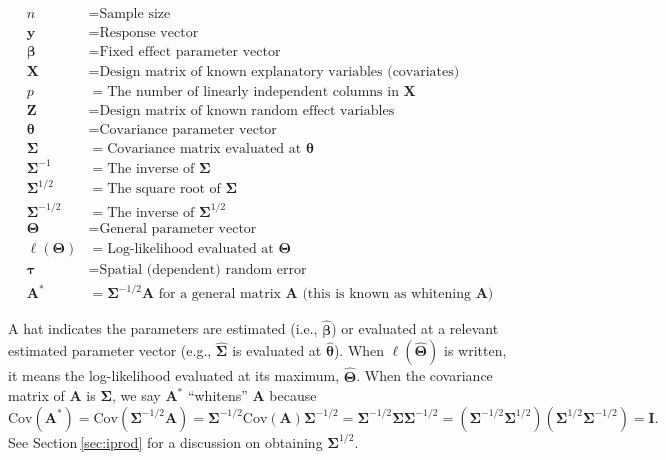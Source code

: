 \documentclass[10pt,letterpaper]{article}
\begin{document}
\begin{equation*}
  \begin{split}
   n & = \text{Sample size} \\
   \mathbf{y} & = \text{Response vector} \\
   \boldsymbol{\beta} & = \text{Fixed effect parameter vector} \\
   \mathbf{X} & = \text{Design matrix of known explanatory variables (covariates)} \\
   p & = \text{The number of linearly independent columns in } \mathbf{X} \\
   \mathbf{Z} & = \text{Design matrix of known random effect variables} \\
   \boldsymbol{\theta} & = \text{Covariance parameter vector} \\   
   \boldsymbol{\Sigma} & = \text{Covariance matrix evaluated at } \boldsymbol{\theta} \\
   \boldsymbol{\Sigma}^{-1} & = \text{The inverse of } \boldsymbol{\Sigma} \\
   \boldsymbol{\Sigma}^{1/2} & = \text{The square root of } \boldsymbol{\Sigma} \\
   \boldsymbol{\Sigma}^{-1/2} & = \text{The inverse of } \boldsymbol{\Sigma}^{1/2} \\
   \boldsymbol{\Theta} & = \text{General parameter vector} \\  
   \ell(\boldsymbol{\Theta}) & = \text{Log-likelihood evaluated at } \boldsymbol{\Theta} \\
   \boldsymbol{\tau} & = \text{Spatial (dependent) random error} \\
   \mathbf{A}^* & = \boldsymbol{\Sigma}^{-1/2}\mathbf{A} \text{ for a general matrix } \mathbf{A} \text{ (this is known as whitening $\mathbf{A}$)} 
  \end{split}
\end{equation*}

A hat indicates the parameters are estimated (i.e.,
\(\hat{\boldsymbol{\beta}}\)) or evaluated at a relevant estimated
parameter vector (e.g., \(\hat{\boldsymbol{\Sigma}}\) is evaluated at
\(\hat{\boldsymbol{\theta}}\)). When \(\ell(\boldsymbol{\hat{\Theta}})\)
is written, it means the log-likelihood evaluated at its maximum,
\(\boldsymbol{\hat{\Theta}}\). When the covariance matrix of
\(\mathbf{A}\) is \(\boldsymbol{\Sigma}\), we say \(\mathbf{A}^*\)
``whitens'' \(\mathbf{A}\) because \begin{equation*}
\text{Cov}(\mathbf{A}^*) = \text{Cov}(\boldsymbol{\Sigma}^{-1/2}\mathbf{A}) = \boldsymbol{\Sigma}^{-1/2}\text{Cov}(\mathbf{A})\boldsymbol{\Sigma}^{-1/2} = \boldsymbol{\Sigma}^{-1/2}\boldsymbol{\Sigma} \boldsymbol{\Sigma}^{-1/2} = (\boldsymbol{\Sigma}^{-1/2}\boldsymbol{\Sigma}^{1/2})(\boldsymbol{\Sigma}^{1/2}\boldsymbol{\Sigma}^{-1/2}) = \mathbf{I}.
\end{equation*} See Section\(~\)\ref{sec:iprod} for a discussion on
obtaining \(\boldsymbol{\Sigma}^{1/2}\).
\end{document}
